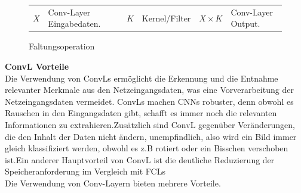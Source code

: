 \documentclass[12pt,a4paper]{scrartcl}
\numberwithin{equation}{section}
\begin{document}
\begin{figure}[h]
		\begin{center}
			\begin{tabular}{r@{: }l r@{: }l r@{: }l}
				$X$ & Conv-Layer Eingabedaten. & $K$ & Kernel/Filter& $ X\times K $ &Conv-Layer Output.
			\end{tabular}
		\end{center}
		\caption{Faltungsoperation }
		\label{Faltungsoperation}
\end{figure}


\textbf{\ac{ConvL} Vorteile}\\
Die Verwendung von \acsp{ConvL} ermöglicht die Erkennung und die Entnahme relevanter Merkmale aus den Netzeingangsdaten, was eine Vorverarbeitung der Netzeingangsdaten vermeidet. \acsp{ConvL} machen \acsp{CNN} robuster, denn obwohl es Rauschen in den Eingangsdaten gibt, schafft es immer noch die relevanten Informationen zu extrahieren.Zusätzlich sind \ac{ConvL}  gegenüber Veränderungen, die den Inhalt der Daten nicht ändern, unempfindlich, also wird ein Bild immer gleich klassifiziert werden, obwohl es z.B rotiert oder ein Bisschen verschoben ist.Ein anderer Hauptvorteil von \ac{ConvL} ist die deutliche Reduzierung der Speicheranforderung im Vergleich mit \acsp{FCL}    \\
Die Verwendung von Conv-Layern bieten mehrere Vorteile.
\end{document}
